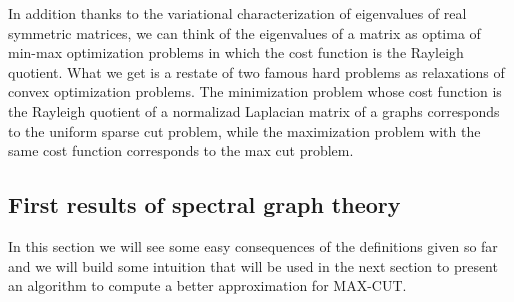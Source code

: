 In addition thanks to the variational characterization of eigenvalues of real symmetric matrices, we can think of the eigenvalues of a matrix as optima of min-max optimization problems in which the cost function is the Rayleigh quotient.
What we get is a restate of two famous hard problems as relaxations of convex optimization problems.
The minimization problem whose cost function is the Rayleigh quotient of a normalizad Laplacian matrix of a graphs corresponds to the uniform sparse cut problem, while the maximization problem with the same cost function corresponds to the max cut problem.  

\subsection{First results of spectral graph theory}
In this section we will see some easy consequences of the definitions given so far and we will build some intuition that will be used in the next section to present an algorithm to compute a better approximation for MAX-CUT.

